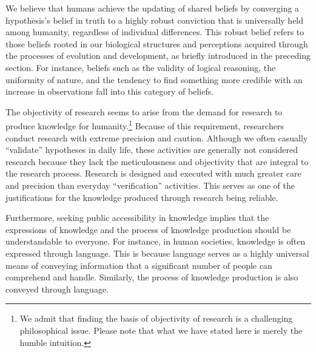 We believe that humans achieve the updating of shared beliefs by converging a hypothesis's belief in truth to a highly robust conviction that is universally held among humanity, regardless of individual differences. This robust belief refers to those beliefs rooted in our biological structures and perceptions acquired through the processes of evolution and development, as briefly introduced in the preceding section. For instance, beliefs such as the validity of logical reasoning, the uniformity of nature, and the tendency to find something more credible with an increase in observations fall into this category of beliefs. 

The objectivity of research seems to arise from the demand for research to produce knowledge for humanity.\footnote{We admit that finding the basis of objectivity of research is a challenging philosophical issue. Please note that what we have stated here is merely the humble intuition. } Because of this requirement, researchers conduct research with extreme precision and caution. Although we often casually ``validate'' hypotheses in daily life, these activities are generally not considered research because they lack the meticulousness and objectivity that are integral to the research process. Research is designed and executed with much greater care and precision than everyday ``verification'' activities. This serves as one of the justifications for the knowledge produced through research being reliable.

Furthermore, seeking public accessibility in knowledge implies that the expressions of knowledge and the process of knowledge production should be understandable to everyone. For instance, in human societies, knowledge is often expressed through language. This is because language serves as a highly universal means of conveying information that a significant number of people can comprehend and handle. Similarly, the process of knowledge production is also conveyed through language.

